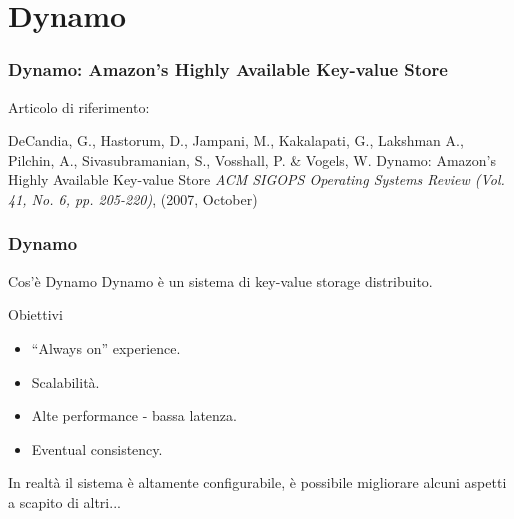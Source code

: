 \section{Dynamo}
\begin{frame}
  \frametitle{Dynamo: Amazon's Highly Available Key-value Store}
  Articolo di riferimento: \\
  \begin{thebibliography}{9}
   DeCandia, G., Hastorum, D., Jampani, M., Kakalapati, G., Lakshman A., Pilchin, A.,
    Sivasubramanian, S., Vosshall, P. \& Vogels, W.
  \newblock Dynamo: Amazon's Highly Available Key-value Store
  \newblock \emph{ACM SIGOPS Operating Systems Review (Vol. 41, No. 6, pp. 205-220)}, (2007, October)
  \end{thebibliography}
\end{frame}

\begin{frame}
  \frametitle{Dynamo}
  \begin{block}{Cos'è Dynamo}
  Dynamo è un sistema di key-value storage distribuito.
  \end{block}
  \begin{block}{Obiettivi}      
      \begin{itemize}
      \item ``Always on'' experience.
      \item Scalabilità.
      \item Alte performance - bassa latenza.
      \item Eventual consistency.
      \end{itemize}
  \end{block}
  In realtà il sistema è altamente configurabile, è possibile migliorare alcuni aspetti a scapito di altri...
\end{frame}



